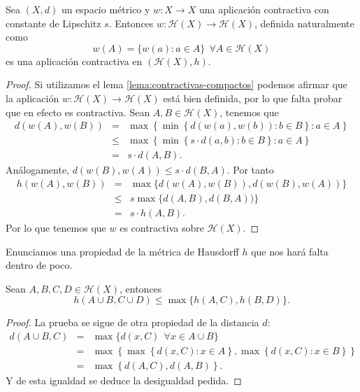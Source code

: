 \begin{lema}
    Sea $(X,d)$ un espacio métrico y $w:X\longrightarrow X$ una aplicación contractiva con constante de Lipschitz $s$. Entonces $w:\mathcal{H}(X)\longrightarrow\mathcal{H}(X)$, definida naturalmente como
    $$
    w(A)=\{w(a):a\in A\}\ \ \forall A\in\mathcal{H}(X)
    $$
    es una aplicación contractiva en $(\mathcal{H}(X),h)$.
\end{lema}
\begin{proof}
    Si utilizamos el lema \ref{lema:contractivas-compactos} podemos afirmar que la aplicación $w:\mathcal{H}(X)\longrightarrow\mathcal{H}(X)$ está bien definida, por lo que falta probar que en efecto es contractiva. Sean $A,B\in\mathcal{H}(X)$, tenemos que
    \begin{eqnarray*}
        d(w(A),w(B)) & = & \max\left\lbrace \min \left\lbrace d(w(a),w(b)): b\in B\right\rbrace : a\in A \right\rbrace \\
                     & \leq &  \max\left\lbrace \min \left\lbrace s\cdot d(a,b): b\in B\right\rbrace : a\in A \right\rbrace \\
                     & = & s\cdot d(A,B).
    \end{eqnarray*}
    Análogamente, $d(w(B),w(A))\leq s\cdot d(B,A)$. Por tanto
    \begin{eqnarray*}
        h(w(A),w(B)) & = & \max \{d(w(A),w(B)), d(w(B),w(A))\} \\
                     & \leq & s \max \{d(A,B), d(B,A))\} \\
                     & = & s\cdot h(A,B).
    \end{eqnarray*}
    Por lo que tenemos que $w$ es contractiva sobre $\mathcal{H}(X)$.
\end{proof}

Enunciamos una propiedad de la métrica de Hausdorff $h$ que nos hará falta dentro de poco.

\begin{lema}
    \label{lema:uniones}
    Sean $A,B,C,D\in\mathcal{H}(X)$, entonces 
    $$h(A\cup B, C\cup D)\leq\max\{h(A,C),h(B,D)\}.$$
\end{lema}
\begin{proof}
    La prueba se sigue de otra propiedad de la distancia $d$:
    \begin{eqnarray*}
    d(A\cup B,C) & = & \max\{d(x,C)\ \ \forall x\in A\cup B\} \\
                 & = & \max\left\lbrace \max\left\lbrace d(x,C):x\in A \right\rbrace, \max\left\lbrace d(x,C):x\in B \right\rbrace\right\rbrace \\
                 & = & \max\left\lbrace d(A,C),d(A,B) \right\rbrace.
    \end{eqnarray*}
    Y de esta igualdad se deduce la desigualdad pedida. %
\end{proof}

